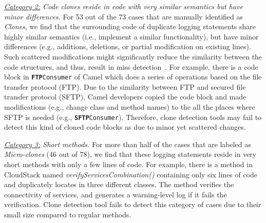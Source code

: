 {\em \underline{Category 2:} Code clones reside in code with very similar semantics but have minor differences.}  %
For 53 out of the 73 cases that are manually identified as {\em Clones}, we find that the surrounding code of duplicate logging statements share highly similar semantics (i.e., implement a similar functionality), but have minor differences (e.g., additions, deletions, or partial modification on existing lines). Such scattered modifications might significantly reduce the similarity between the code structures, and thus, result in miss detection~\cite{ROY2009470,nicad}. %
For example, there is a code block in {\tt\small \textbf{FTP}Consumer} of Camel which does a series of operations based on the file transfer protocol (FTP). %
Due to the similarity between FTP and secured file transfer protocol (SFTP), Camel developers copied the code block and made modifications (e.g., change class and method names) to the all the places where SFTP is needed (e.g., {\tt\small \textbf{SFTP}Consumer}). Therefore, clone detection tools may fail to detect this kind of cloned code blocks as due to minor yet scattered changes.

{\em \underline{Category 3:} Short methods.}
For more than half of the cases that are labeled as {\em Micro-clones} (46 out of 78), we find that these logging statements reside in very short methods with only a few lines of code. For example, there is a method in CloudStack named {\em verifyServicesCombination()} containing only six lines of code and duplicately locates in three different classes. The method verifies the connectivity of services, and generates a warning-level log if it fails the verification. Clone detection tool fails to detect this category of cases due to their small size compared to regular methods.



